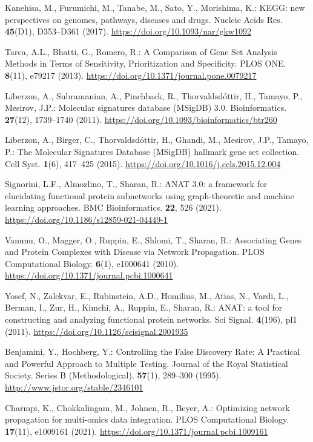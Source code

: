 \documentclass{article}
\begin{document}
\begin{thebibliography}{spmpsci}
Kanehisa, M., Furumichi, M., Tanabe, M., Sato, Y., Morishima, K.:
KEGG: new perspectives on genomes, pathways, diseases and drugs.
Nucleic Acids Res. \textbf{45}(D1), D353--D361 (2017).
\url{https://doi.org/10.1093/nar/gkw1092}

Tarca, A.L., Bhatti, G., Romero, R.:
A Comparison of Gene Set Analysis Methods in Terms of Sensitivity, Prioritization and Specificity.
PLOS ONE. \textbf{8}(11), e79217 (2013).
\url{https://doi.org/10.1371/journal.pone.0079217}

Liberzon, A., Subramanian, A., Pinchback, R., Thorvaldsdóttir, H., Tamayo, P., Mesirov, J.P.:
Molecular signatures database (MSigDB) 3.0.
Bioinformatics. \textbf{27}(12), 1739--1740 (2011).
\url{https://doi.org/10.1093/bioinformatics/btr260}

Liberzon, A., Birger, C., Thorvaldsdóttir, H., Ghandi, M., Mesirov, J.P., Tamayo, P.:
The Molecular Signatures Database (MSigDB) hallmark gene set collection.
Cell Syst. \textbf{1}(6), 417--425 (2015).
\url{https://doi.org/10.1016/j.cels.2015.12.004}

Signorini, L.F., Almozlino, T., Sharan, R.:
ANAT 3.0: a framework for elucidating functional protein subnetworks using graph-theoretic and machine learning approaches.
BMC Bioinformatics. \textbf{22}, 526 (2021).
\url{https://doi.org/10.1186/s12859-021-04449-1}

Vanunu, O., Magger, O., Ruppin, E., Shlomi, T., Sharan, R.:
Associating Genes and Protein Complexes with Disease via Network Propagation.
PLOS Computational Biology. \textbf{6}(1), e1000641 (2010).
\url{https://doi.org/10.1371/journal.pcbi.1000641}

Yosef, N., Zalckvar, E., Rubinstein, A.D., Homilius, M., Atias, N., Vardi, L., Berman, I., Zur, H., Kimchi, A., Ruppin, E., Sharan, R.:
ANAT: a tool for constructing and analyzing functional protein networks.
Sci Signal. \textbf{4}(196), pl1 (2011).
\url{https://doi.org/10.1126/scisignal.2001935}

Benjamini, Y., Hochberg, Y.:
Controlling the False Discovery Rate: A Practical and Powerful Approach to Multiple Testing.
Journal of the Royal Statistical Society. Series B (Methodological). \textbf{57}(1), 289--300 (1995).
\url{http://www.jstor.org/stable/2346101}

Charmpi, K., Chokkalingam, M., Johnen, R., Beyer, A.:
Optimizing network propagation for multi-omics data integration.
PLOS Computational Biology. \textbf{17}(11), e1009161 (2021).
\url{https://doi.org/10.1371/journal.pcbi.1009161}

\end{thebibliography}
\end{document}
